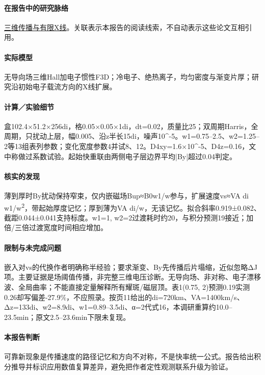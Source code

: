 \documentclass[UTF8,a4paper,11pt,openany,fontset=fandol]{ctexbook}
\begin{document}
\paragraph{在报告中的研究脉络}\hyperref[story:three]{三维传播与有限X线}。关联表示本报告的阅读线索，不自动表示这些论文互相引用。

\paragraph{实际模型}无导向场三维Hall加电子惯性F3D；冷电子、绝热离子，均匀密度与渐变片厚；研究沿初始电子载流方向的X线扩展。

\paragraph{计算／实验细节}盒102.4×51.2×256di，格0.05×0.05×1di，dt=0.02，质量比25；双周期Harris，全周期，只扰动上层，幅0.005、沿z半长15di，噪声10\textasciicircum{}-5。w1=0.75–2.5、w2=1.25–2等13组表列参数；变化宽度参数4并试8、12。D4xy=1.6×10\textasciicircum{}-5、D4z=0.16，文中称做过系数试验。起始快重联由两侧电子层边界平均|By|超过0.04判定。

\paragraph{核实的发现}薄到厚时By扰动保持窄束，仅内嵌磁场Bup≈B0w1/w参与，扩展速度vs≈VA di w1/w\textsuperscript{2}，带起始厚度记忆；厚到薄为VA di/w，无该记忆。拟合斜率0.919±0.082、截距0.044±0.041支持标度。w1=1, w2=2过渡耗时约20，与积分预测19接近；加倍/三倍过渡宽度时间相应增加。

\paragraph{限制与未完成问题}嵌入对vs的代换作者明确称半经验；要求渐变、By先传播后片塌缩，近似忽略ΔJ项。主要证据是场阈值传播，非完整三维电压诊断。无导向场、非对称、电子漂移波、全局曲率；不能直接定量解释所有耀斑/磁层顶。表1(0.75, 2)预测0.19实测0.26却写偏差-27.9\%，不应照录。按页11给出的di=720km、VA=1400km/s、Δz=133di、w2=8.9di、w1=0.89–3.5di、α=2代式16，本调研重算约10.0–23.5min；原文2.5–23.6min下限未复现。

\paragraph{本报告判断}可靠新现象是传播速度的路径记忆和方向不对称，不是快率统一公式。报告给出积分推导并标识应用数值复算差异，避免把作者定性观测联系升级为验证。
\end{document}
